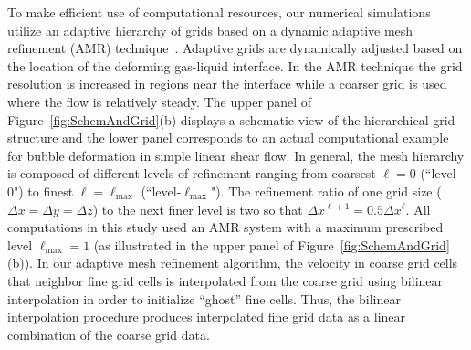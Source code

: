 \documentclass[review]{elsarticle}
\begin{document}
To make efficient use of computational resources, our numerical simulations
utilize an adaptive hierarchy of grids based on a dynamic adaptive mesh
refinement (AMR) technique~\cite{SusAlmBelColHowWel99}.  Adaptive grids are
dynamically adjusted based on the location of the 
deforming gas-liquid interface.
In the AMR technique the grid resolution is increased in regions near the
interface while a coarser grid is used where the flow is relatively steady.
The upper panel of Figure~\ref{fig:SchemAndGrid}(b) displays a schematic view
of the hierarchical grid structure and the lower panel corresponds to an actual
computational example for bubble deformation in simple linear shear flow.  In
general, the mesh hierarchy is composed of different levels of refinement
ranging from coarsest $\ell=0$ (``level-0") to finest
$\ell=\ell_{\textrm{max}}$ (``level-$\ell_{\textrm{max}}$").  The refinement
ratio of one grid size ($\Delta x=\Delta y=\Delta z$) to the next finer level
is two so that $\Delta x^{\ell+1}=0.5\Delta x^{\ell}$.  All computations in
this study used an AMR system with a maximum prescribed level
$\ell_{\textrm{max}} = 1$ (as illustrated in the upper panel of
Figure~\ref{fig:SchemAndGrid}(b)).  In our adaptive mesh refinement algorithm,
the velocity in coarse grid cells that neighbor fine grid cells is interpolated
from the coarse grid using bilinear interpolation in order to initialize
``ghost'' fine cells. Thus, the bilinear interpolation procedure produces
interpolated fine grid data as a linear combination of the coarse grid data. 
\end{document}
